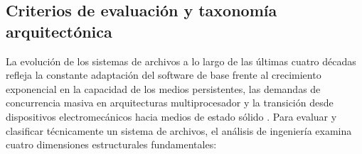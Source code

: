 \documentclass[12pt]{article}
\begin{document}
\subsection{Criterios de evaluación y taxonomía arquitectónica}
\label{subsec:criteriosEvaluacionTaxonomia}

La evolución de los sistemas de archivos a lo largo de las últimas cuatro décadas refleja la constante adaptación del software de base frente al crecimiento exponencial en la capacidad de los medios persistentes, las demandas de concurrencia masiva en arquitecturas multiprocesador y la transición desde dispositivos electromecánicos hacia medios de estado sólido \parencite[\S 12.7, pp.\ 575--578]{stallings2018operating}. Para evaluar y clasificar técnicamente un sistema de archivos, el análisis de ingeniería examina cuatro dimensiones estructurales fundamentales:
\end{document}
